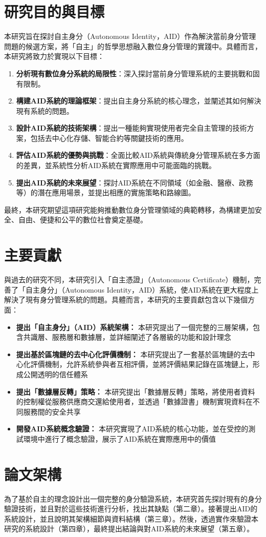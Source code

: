 \section{研究目的與目標}
本研究旨在探討自主身分（Autonomous Identity，AID）作為解決當前身分管理問題的候選方案，將「自主」的哲學思想融入數位身分管理的實踐中。具體而言，本研究將致力於實現以下目標：
\begin{enumerate}
  \item \textbf{分析現有數位身分系統的局限性}：深入探討當前身分管理系統的主要挑戰和固有限制。
  \item \textbf{構建AID系統的理論框架}：提出自主身分系統的核心理念，並闡述其如何解決現有系統的問題。
  \item \textbf{設計AID系統的技術架構}：提出一種能夠實現使用者完全自主管理的技術方案，包括去中心化存儲、智能合約等關鍵技術的應用。
  \item \textbf{評估AID系統的優勢與挑戰}：全面比較AID系統與傳統身分管理系統在多方面的差異，並系統性分析AID系統在實際應用中可能面臨的挑戰。
  \item \textbf{提出AID系統的未來展望}：探討AID系統在不同領域（如金融、醫療、政務等）的潛在應用場景，並提出相應的實施策略和路線圖。
\end{enumerate}
最終，本研究期望這項研究能夠推動數位身分管理領域的典範轉移，為構建更加安全、自由、便捷和公平的數位社會奠定基礎。
\section{主要貢獻}
與過去的研究不同，本研究引入「自主憑證」（Autonomous Certificate）\cite{NTU202102846}機制，完善了「自主身分」（Autonomous Identity，AID）系統\cite{ntu-lin2014autonomous}，使AID系統在更大程度上解決了現有身分管理系統的問題。具體而言，本研究的主要貢獻包含以下幾個方面：
\begin{itemize}
  \item \textbf{提出「自主身分」（AID）系統架構：} 本研究提出了一個完整的三層架構，包含共識層、服務層和數據層，並詳細闡述了各層級的功能和設計理念
  \item \textbf{提出基於區塊鏈的去中心化評價機制：} 本研究提出了一套基於區塊鏈的去中心化評價機制，允許系統參與者互相評價，並將評價結果記錄在區塊鏈上，形成公開透明的信任體系
  \item \textbf{提出「數據層反轉」策略：} 本研究提出「數據層反轉」策略，將使用者資料的控制權從服務供應商交還給使用者，並透過「數據證書」機制實現資料在不同服務間的安全共享
  \item \textbf{開發AID系統概念驗證：} 本研究實現了AID系統的核心功能，並在受控的測試環境中進行了概念驗證，展示了AID系統在實際應用中的價值
\end{itemize}
\section{論文架構}
為了基於自主的理念設計出一個完整的身分驗證系統，本研究首先探討現有的身分驗證技術，並且對於這些技術進行分析，找出其缺點（第二章）。接著提出AID的系統設計，並且說明其架構細節與資料結構（第三章）。然後，透過實作來驗證本研究的系統設計（第四章），最終提出結論與對AID系統的未來展望（第五章）。